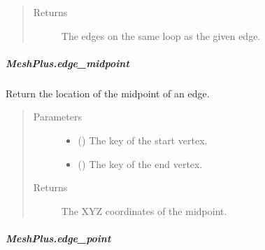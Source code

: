 \documentclass[letterpaper,10pt,english]{sphinxmanual}
\begin{document}
\begin{fulllineitems}
\begin{fulllineitems}
\begin{quote}
\begin{description}
\item[{Returns}] \leavevmode
{} \textendash{} The edges on the same loop as the given edge.

\end{description}\end{quote}

\end{fulllineitems}



\subparagraph{MeshPlus.edge\_midpoint}
\label{\detokenize{api/generated/directional_clustering.mesh.MeshPlus.edge_midpoint:meshplus-edge-midpoint}}\label{\detokenize{api/generated/directional_clustering.mesh.MeshPlus.edge_midpoint::doc}}

\begin{fulllineitems}
\label{\detokenize{api/generated/directional_clustering.mesh.MeshPlus.edge_midpoint:directional_clustering.mesh.MeshPlus.edge_midpoint}}
Return the location of the midpoint of an edge.
\begin{quote}\begin{description}
\item[{Parameters}] \leavevmode\begin{itemize}
\item {} 
 () \textendash{} The key of the start vertex.

\item {} 
 () \textendash{} The key of the end vertex.

\end{itemize}

\item[{Returns}] \leavevmode
{} \textendash{} The XYZ coordinates of the midpoint.

\end{description}\end{quote}

\end{fulllineitems}



\subparagraph{MeshPlus.edge\_point}
\label{\detokenize{api/generated/directional_clustering.mesh.MeshPlus.edge_point:meshplus-edge-point}}\label{\detokenize{api/generated/directional_clustering.mesh.MeshPlus.edge_point::doc}}


\end{fulllineitems}
\end{document}
